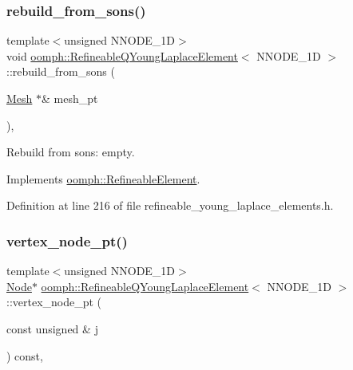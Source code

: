 \subsubsection{\texorpdfstring{rebuild\+\_\+from\+\_\+sons()}{rebuild\_from\_sons()}}
{\footnotesize\ttfamily template$<$unsigned N\+N\+O\+D\+E\+\_\+1D$>$ \\
void \hyperlink{classoomph_1_1RefineableQYoungLaplaceElement}{oomph\+::\+Refineable\+Q\+Young\+Laplace\+Element}$<$ N\+N\+O\+D\+E\+\_\+1D $>$\+::rebuild\+\_\+from\+\_\+sons (\begin{DoxyParamCaption}\item[{\hyperlink{classoomph_1_1Mesh}{Mesh} $\ast$\&}]{mesh\+\_\+pt }\end{DoxyParamCaption})\hspace{0.3cm}{\ttfamily [inline]}, {\ttfamily [virtual]}}



Rebuild from sons\+: empty. 



Implements \hyperlink{classoomph_1_1RefineableElement_a33324be27833fa4b78279d17158215fa}{oomph\+::\+Refineable\+Element}.



Definition at line 216 of file refineable\+\_\+young\+\_\+laplace\+\_\+elements.\+h.

\mbox{\label{classoomph_1_1RefineableQYoungLaplaceElement_ad13e8cb5cdf4ddf4451f6c0ec06d56fe}} 
\subsubsection{\texorpdfstring{vertex\+\_\+node\+\_\+pt()}{vertex\_node\_pt()}}
{\footnotesize\ttfamily template$<$unsigned N\+N\+O\+D\+E\+\_\+1D$>$ \\
\hyperlink{classoomph_1_1Node}{Node}$\ast$ \hyperlink{classoomph_1_1RefineableQYoungLaplaceElement}{oomph\+::\+Refineable\+Q\+Young\+Laplace\+Element}$<$ N\+N\+O\+D\+E\+\_\+1D $>$\+::vertex\+\_\+node\+\_\+pt (\begin{DoxyParamCaption}\item[{const unsigned \&}]{j }\end{DoxyParamCaption}) const\hspace{0.3cm}{\ttfamily [inline]}, {\ttfamily [virtual]}}



